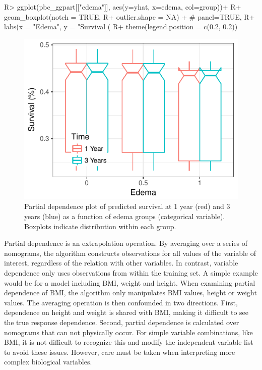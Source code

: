 \documentclass[article]{jss}
\begin{document}
\begin{Schunk}
\begin{Sinput}
R> ggplot(pbc_ggpart[["edema"]], aes(y=yhat, x=edema, col=group))+
R+   geom_boxplot(notch = TRUE,
R+                outlier.shape = NA) + # panel=TRUE,
R+   labs(x = "Edema", y = "Survival (%
R+   theme(legend.position = c(0.2, 0.2))
\end{Sinput}
\begin{figure}[!htb]

{\centering \includegraphics{fig-rfs/rfs-pbc-partial-edema-1} 

}

\caption[Partial dependence plot of predicted survival at 1 year (red) and 3 years (blue) as a function of edema groups (categorical variable)]{Partial dependence plot of predicted survival at 1 year (red) and 3 years (blue) as a function of edema groups (categorical variable). Boxplots indicate distribution within each group.}\label{fig:pbc-partial-edema}
\end{figure}
\end{Schunk}

Partial dependence is an extrapolation operation. By averaging over a
series of nomograms, the algorithm constructs observations for all
values of the variable of interest, regardless of the relation with
other variables. In contrast, variable dependence only uses observations
from within the training set. A simple example would be for a model
including BMI, weight and height. When examining partial dependence of
BMI, the algorithm only manipulates BMI values, height or weight values.
The averaging operation is then confounded in two directions. First,
dependence on height and weight is shared with BMI, making it difficult
to see the true response dependence. Second, partial dependence is
calculated over nomograms that can not physically occur. For simple
variable combinations, like BMI, it is not difficult to recognize this
and modify the independent variable list to avoid these issues. However,
care must be taken when interpreting more complex biological variables.
\end{document}
